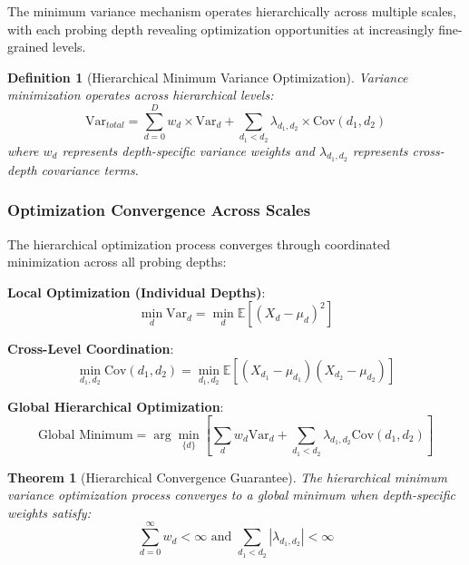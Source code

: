 \documentclass[12pt,a4paper]{article}
\newtheorem{theorem}{Theorem}
\newtheorem{definition}{Definition}
\begin{document}
The minimum variance mechanism operates hierarchically across multiple scales, with each probing depth revealing optimization opportunities at increasingly fine-grained levels.

\begin{definition}[Hierarchical Minimum Variance Optimization]
Variance minimization operates across hierarchical levels:
\begin{equation}
\text{Var}_{total} = \sum_{d=0}^{D} w_d \times \text{Var}_d + \sum_{d_1<d_2} \lambda_{d_1,d_2} \times \text{Cov}(d_1, d_2)
\end{equation}
where $w_d$ represents depth-specific variance weights and $\lambda_{d_1,d_2}$ represents cross-depth covariance terms.
\end{definition}

\subsubsection{Optimization Convergence Across Scales}

The hierarchical optimization process converges through coordinated minimization across all probing depths:

\textbf{Local Optimization (Individual Depths)}:
\begin{equation}
\min_{d} \text{Var}_d = \min_{d} \mathbb{E}[(X_d - \mu_d)^2]
\end{equation}

\textbf{Cross-Level Coordination}:
\begin{equation}
\min_{d_1,d_2} \text{Cov}(d_1, d_2) = \min_{d_1,d_2} \mathbb{E}[(X_{d_1} - \mu_{d_1})(X_{d_2} - \mu_{d_2})]
\end{equation}

\textbf{Global Hierarchical Optimization}:
\begin{equation}
\text{Global Minimum} = \arg\min_{\{d\}} \left[\sum_d w_d \text{Var}_d + \sum_{d_1<d_2} \lambda_{d_1,d_2} \text{Cov}(d_1, d_2)\right]
\end{equation}

\begin{theorem}[Hierarchical Convergence Guarantee]
The hierarchical minimum variance optimization process converges to a global minimum when depth-specific weights satisfy:
\begin{equation}
\sum_{d=0}^{\infty} w_d < \infty \text{ and } \sum_{d_1<d_2} |\lambda_{d_1,d_2}| < \infty
\end{equation}
\end{theorem}
\end{document}
